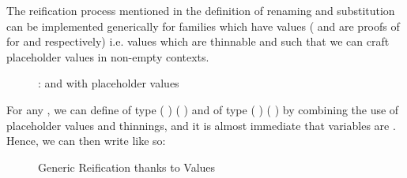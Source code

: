The reification process mentioned in the definition of renaming and substitution
can be implemented generically for  families which have 
values ( and  are proofs of
 for  and  respectively) i.e. values which are thinnable
and such that we can craft placeholder values in non-empty contexts.

\begin{figure}[h]
\caption{:  and with placeholder values}
\end{figure}

For any  , we can define  of
type {( )  ( \AF{++} )} and  of
type {( )  ( \AF{++} )} by combining the use
of placeholder values and thinnings, and it is almost immediate that variables
are . Hence, we can then write  like so:

\begin{figure}[h]
\caption{Generic Reification thanks to  Values}
\end{figure}
